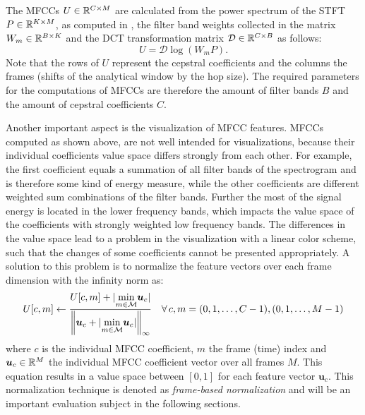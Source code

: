 \FloatBarrier
\noindent
The MFCCs $U \in \mathbb{R}^{C \times M}$ are calculated from the power spectrum of the STFT $P \in \mathbb{R}^{K \times M}$, as computed in , the filter band weights collected in the matrix $W_m \in \mathbb{R}^{B \times K}$ and the DCT transformation matrix $\mathcal{D} \in \mathbb{R}^{C \times B}$ as follows:
\begin{equation}\label{eq:signal_mfcc_mfcc}
  U = \mathcal{D} \log{ \left( W_m   P \right) }.
\end{equation}
Note that the rows of $U$ represent the cepstral coefficients and the columns the frames (shifts of the analytical window by the hop size).
The required parameters for the computations of MFCCs are therefore the amount of filter bands $B$ and the amount of cepstral coefficients $C$.

Another important aspect is the visualization of MFCC features.
MFCCs computed as shown above, are not well intended for visualizations, because their individual coefficients value space differs strongly from each other.
For example, the first coefficient equals a summation of all filter bands of the spectrogram and is therefore some kind of energy measure, while the other coefficients are different weighted sum combinations of the filter bands.
Further the most of the signal energy is located in the lower frequency bands, which impacts the value space of the coefficients with strongly weighted low frequency bands.
The differences in the value space lead to a problem in the visualization with a linear color scheme, such that the changes of some coefficients cannot be presented appropriately.
A solution to this problem is to normalize the feature vectors over each frame dimension with the infinity norm as:
\begin{equation}\label{eq:signal_mfcc_norm}
  U[c, m] \gets \frac{U[c, m] + \vert \underset{m \in \mathcal{M}}{\min} \bm{u}_c \vert}{\norm{\bm{u}_c + \vert \underset{m \in \mathcal{M}}{\min} \bm{u}_c \vert}_\infty} \quad \forall \, c, m = (0, 1, \dots, C - 1), (0, 1, \dots, M - 1)
\end{equation}
where $c$ is the individual MFCC coefficient, $m$ the frame (time) index and $\bm{u}_c \in \mathbb{R}^M$ the individual MFCC coefficient vector over all frames $M$.
This equation results in a value space between $[0, 1]$ for each feature vector $\bm{u}_c$.
This normalization technique is denoted as \emph{frame-based normalization} and will be an important evaluation subject in the following sections.

